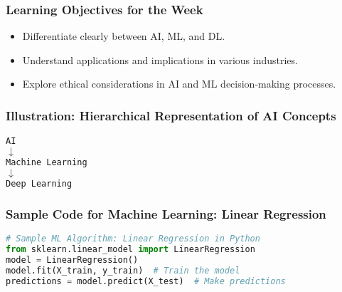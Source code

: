 \documentclass[aspectratio=169]{beamer}
\begin{document}
\begin{frame}[fragile]
    \frametitle{Learning Objectives for the Week}

    \begin{itemize}
        \item Differentiate clearly between AI, ML, and DL.
        \item Understand applications and implications in various industries.
        \item Explore ethical considerations in AI and ML decision-making processes.
    \end{itemize}
\end{frame}

\begin{frame}[fragile]
    \frametitle{Illustration: Hierarchical Representation of AI Concepts}

    \begin{center}
    \texttt{AI}\\
    \hspace{1cm} $\downarrow$\\
    \texttt{Machine Learning}\\
    \hspace{1cm} $\downarrow$\\
    \texttt{Deep Learning}
    \end{center}
\end{frame}

\begin{frame}[fragile]
    \frametitle{Sample Code for Machine Learning: Linear Regression}

    \begin{lstlisting}[language=Python]
# Sample ML Algorithm: Linear Regression in Python
from sklearn.linear_model import LinearRegression
model = LinearRegression()
model.fit(X_train, y_train)  # Train the model
predictions = model.predict(X_test)  # Make predictions
    \end{lstlisting}
\end{frame}
\end{document}
